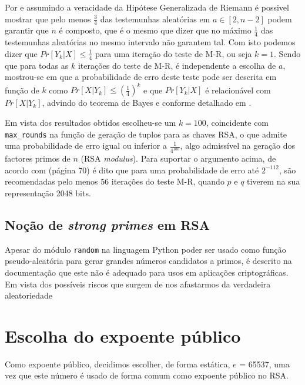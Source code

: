 \documentclass[dvipsnames]{article}
\begin{document}

\noindent Por \cite{DBLP:journals/dcc/Lenstra00} e assumindo a veracidade da Hipótese Generalizada de Riemann é possivel mostrar que pelo menos $\frac{3}{4}$ das testemunhas aleatórias em $a \in [2,n-2]$ podem garantir que $n$ é composto, que é o mesmo que dizer que no máximo $\frac{1}{4}$ das testemunhas aleatórias no mesmo intervalo não garantem tal. Com isto podemos dizer que $Pr[Y_k|X] \leq \frac{1}{4}$ para uma iteração do teste de M-R, ou seja $k=1$. Sendo que para todas as $k$ iterações do teste de M-R, é independente a escolha de $a$, mostrou-se em \cite{1204.1657v2} que a probabilidade de erro deste teste pode ser descrita em função de $k$ como $Pr[X|Y_k] \leq (\frac{1}{4})^k$ e que $Pr[Y_k|X]$ é relacionável com $Pr[X|Y_k]$, advindo do teorema de Bayes e conforme detalhado em \cite{1709.09963}.

\vskip 0.4cm

\noindent Em vista dos resultados obtidos escolheu-se um $k=100$, coincidente com \texttt{max\_rounds} na função de geração de tuplos para as chaves RSA, o que admite uma probabilidade de erro igual ou inferior a $\frac{1}{4^{100}}$, algo admissível na geração dos factores primos de $n$ (RSA \textit{modulus}). Para suportar o argumento acima, de acordo com \cite{FIPS} (página 70) é dito que para uma probabilidade de erro até $2^{-112}$, são recomendadas pelo menos $56$ iterações do teste M-R, quando $p$ e $q$ tiverem na sua representação 2048 bits.

\subsection{Noção de \textit{strong primes} em RSA}

Apesar do módulo \texttt{random} na linguagem Python poder ser usado como função pseudo-aleatória para gerar grandes números candidatos a primos, é descrito na documentação \cite{pyrandom} que este não é adequado para usos em aplicações criptográficas. Em vista dos possíveis riscos que surgem de nos afastarmos da verdadeira aleatoriedade

\section{Escolha do expoente público}
Como expoente público, decidimos escolher, de forma estática, $e$ =  65537, uma vez que este número é usado de forma comum como expoente público no RSA.
\end{document}

